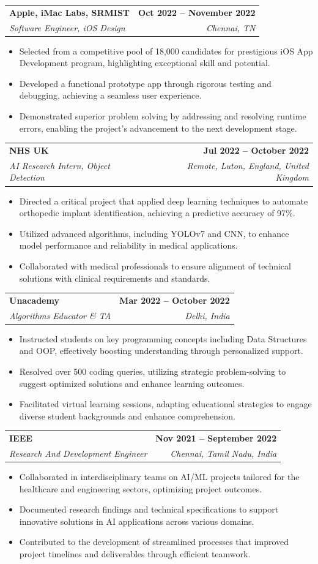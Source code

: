 \documentclass[letterpaper,11pt]{article}
\makeatletter
\newcommand{\resumeItem}[1]{
  \item\small{
    {#1 \vspace{-2pt}}
  }
}
\newcommand{\resumeSubheading}[4]{
  \vspace{-2pt}\item
    \begin{tabular*}{1.0\textwidth}[t]{l@{\extracolsep{\fill}}r}
      \textbf{#1} & \textbf{\small #2} \\
      \textit{\small#3} & \textit{\small #4} \\
    \end{tabular*}\vspace{-7pt}
}
\newcommand{\resumeItemListStart}{\begin{itemize}}
\newcommand{\resumeItemListEnd}{\end{itemize}\vspace{-5pt}}
\makeatother
\begin{document}
    \resumeSubheading
      {Apple, iMac Labs, SRMIST}{Oct 2022 -- November 2022}
      {Software Engineer, iOS Design}{Chennai, TN}
      \resumeItemListStart
        \resumeItem{Selected from a competitive pool of 18,000 candidates for prestigious iOS App Development program, highlighting exceptional skill and potential.}
        \resumeItem{Developed a functional prototype app through rigorous testing and debugging, achieving a seamless user experience.}
        \resumeItem{Demonstrated superior problem solving by addressing and resolving runtime errors, enabling the project's advancement to the next development stage.}
      \resumeItemListEnd

    \resumeSubheading
      {NHS UK}{Jul 2022 -- October 2022}
      {AI Research Intern, Object Detection}{Remote, Luton, England, United Kingdom}
      \resumeItemListStart
        \resumeItem{Directed a critical project that applied deep learning techniques to automate orthopedic implant identification, achieving a predictive accuracy of 97\%.}
        \resumeItem{Utilized advanced algorithms, including YOLOv7 and CNN, to enhance model performance and reliability in medical applications.}
        \resumeItem{Collaborated with medical professionals to ensure alignment of technical solutions with clinical requirements and standards.}
      \resumeItemListEnd

    \resumeSubheading
      {Unacademy}{Mar 2022 -- October 2022}
      {Algorithms Educator \& TA}{Delhi, India}
      \resumeItemListStart
        \resumeItem{Instructed students on key programming concepts including Data Structures and OOP, effectively boosting understanding through personalized support.}
        \resumeItem{Resolved over 500 coding queries, utilizing strategic problem-solving to suggest optimized solutions and enhance learning outcomes.}
        \resumeItem{Facilitated virtual learning sessions, adapting educational strategies to engage diverse student backgrounds and enhance comprehension.}
      \resumeItemListEnd

    \resumeSubheading
      {IEEE}{Nov 2021 -- September 2022}
      {Research And Development Engineer}{Chennai, Tamil Nadu, India}
      \resumeItemListStart
        \resumeItem{Collaborated in interdisciplinary teams on AI/ML projects tailored for the healthcare and engineering sectors, optimizing project outcomes.}
        \resumeItem{Documented research findings and technical specifications to support innovative solutions in AI applications across various domains.}
        \resumeItem{Contributed to the development of streamlined processes that improved project timelines and deliverables through efficient teamwork.}
      \resumeItemListEnd
    
\end{document}
